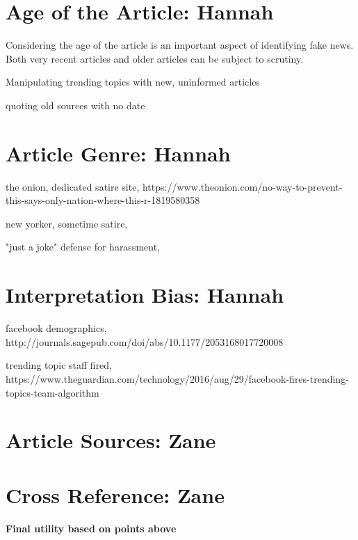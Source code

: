 \documentclass[12pt]{article}
\begin{document}
\section{Age of the Article: Hannah}
Considering the age of the article is an important aspect of identifying fake news. Both very recent articles and older articles can be subject to scrutiny.

Manipulating trending topics with new, uninformed articles

quoting old sources with no date



\section{Article Genre: Hannah}

the onion, dedicated satire site, https://www.theonion.com/no-way-to-prevent-this-says-only-nation-where-this-r-1819580358

new yorker, sometime satire, 

"just a joke" defense for harassment, 



\section{Interpretation Bias: Hannah}

facebook demographics, http://journals.sagepub.com/doi/abs/10.1177/2053168017720008

trending topic staff fired, https://www.theguardian.com/technology/2016/aug/29/facebook-fires-trending-topics-team-algorithm



\section{Article Sources: Zane}



\section{Cross Reference: Zane}



\paragraph{Final utility based on points above}

\newpage


\end{document}
